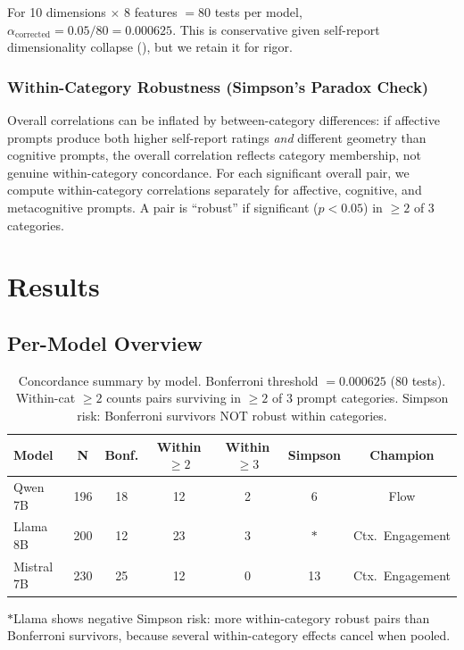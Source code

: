 \documentclass[11pt,a4paper]{article}
\begin{document}
For 10 dimensions $\times$ 8 features $= 80$ tests per model, $\alpha_{\text{corrected}} = 0.05 / 80 = 0.000625$. This is conservative given self-report dimensionality collapse (), but we retain it for rigor.

\subsubsection{Within-Category Robustness (Simpson's Paradox Check)}

Overall correlations can be inflated by between-category differences: if affective prompts produce both higher self-report ratings \emph{and} different geometry than cognitive prompts, the overall correlation reflects category membership, not genuine within-category concordance. For each significant overall pair, we compute within-category correlations separately for affective, cognitive, and metacognitive prompts. A pair is ``robust'' if significant ($p < 0.05$) in $\geq 2$ of 3 categories.

\section{Results}

\subsection{Per-Model Overview}

\begin{table}[H]
\centering
\caption{Concordance summary by model. Bonferroni threshold $= 0.000625$ (80 tests). Within-cat $\geq 2$ counts pairs surviving in $\geq 2$ of 3 prompt categories. Simpson risk: Bonferroni survivors NOT robust within categories.}
\label{tab:model_summary}
\begin{tabular}{lcccccc}
\toprule
\textbf{Model} & \textbf{N} & \textbf{Bonf.} & \textbf{Within $\geq 2$} & \textbf{Within $\geq 3$} & \textbf{Simpson} & \textbf{Champion} \\
\midrule
Qwen 7B    & 196 & 18 & 12 & 2 & 6  & Flow \\
Llama 8B   & 200 & 12 & 23 & 3 & $*$ & Ctx.\ Engagement \\
Mistral 7B & 230 & 25 & 12 & 0 & 13 & Ctx.\ Engagement \\
\bottomrule
\end{tabular}

\raggedright\small $*$Llama shows negative Simpson risk: more within-category robust pairs than Bonferroni survivors, because several within-category effects cancel when pooled.
\end{table}
\end{document}
